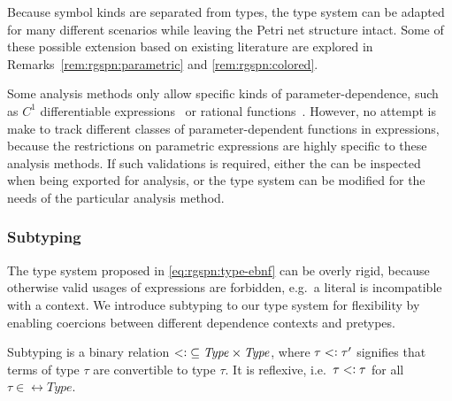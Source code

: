 Because symbol kinds are separated from types, the type system can be adapted for many different scenarios while leaving the Petri net structure intact. Some of these possible extension based on existing literature are explored in Remarks~\ref{rem:rgspn:parametric} and \ref{rem:rgspn:colored}.

\begin{remark}\label{rem:rgspn:parametric}
  Some analysis methods only allow specific kinds of parameter-dependence, such as \(C^1\) differentiable expressions~\citep{Blake88sensitivity} or rational functions~\citep{Hahn11parametric}. However, no attempt is make to track different classes of parameter-dependent functions in  expressions, because the restrictions on parametric expressions are highly specific to these analysis methods. If such validations is required, either the  can be inspected when being exported for analysis, or the type system can be modified for the needs of the particular analysis method.
\end{remark}

\subsubsection{Subtyping}

The type system proposed in \cref{eq:rgspn:type-ebnf} can be overly rigid, because otherwise valid usages of expressions are forbidden, e.g.~a  literal is incompatible with a  context. We introduce subtyping to our type system for flexibility by enabling coercions between different dependence contexts and pretypes.

Subtyping is a binary relation \({\mathrel{<\vcentcolon}} \subseteq \textrm{\itshape Type\/} \times \textrm{\itshape Type\/}\), where \(\tau \mathrel{<\vcentcolon} \tau'\) signifies that terms of type \(\tau\) are convertible to type \(\tau\). It is reflexive, i.e.~\(\tau \mathrel{<\vcentcolon} \tau\) for all \(\tau \in \rel{Type}\).

